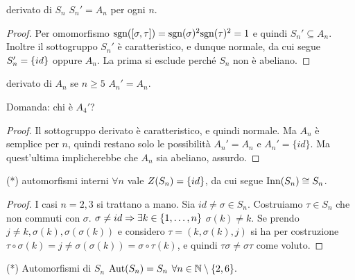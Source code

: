 \begin{proposition}{derivato di $S_n$}
    $S_n' = A_n$ per ogni $n$.    
\end{proposition}
\begin{proof}
    Per omomorfismo $\text{sgn}([\sigma, \tau]) = \text{sgn}(\sigma)^2\text{sgn}(\tau)^2 = 1$ e quindi $S_n' \subseteq A_n$. \\ Inoltre il sottogruppo $S_n'$ è caratteristico, e dunque normale, da cui segue $S_n' = \left\{ id \right\}$ oppure $A_n$. La prima si esclude perché $S_n$ non è abeliano. 
\end{proof}
\begin{proposition}{derivato di $A_n$}
    se $n \geq 5$ $A_n' = A_n$.
    
    Domanda: chi è $A_4'$?
\end{proposition}
\begin{proof}
    Il sottogruppo derivato è caratteristico, e quindi normale. Ma $A_n$ è semplice per $n $, quindi restano solo le possibilità $A_n' = A_n$ e $A_n' = \{ id\}$. Ma quest'ultima implicherebbe che $A_n$ sia abeliano, assurdo. 
\end{proof}
\hypertarget{InnSn}{\begin{proposition}{(*) automorfismi interni}
    $\forall n$ vale $Z(S_n) = \left\{ id \right\}$, da cui segue $\text{Inn}(S_n) \cong S_n$. 
\end{proposition}}
\begin{proof}
    I casi $n = 2,3$ si trattano a mano. Sia $id \neq \sigma \in S_n$. Costruiamo $\tau \in S_n$ che non commuti con $\sigma$. $\sigma \neq id \Rightarrow \exists k \in \left\{ 1, \dots, n \right\}$ $\sigma(k) \neq k$. Se prendo $j \neq k,\sigma(k),\sigma(\sigma(k))$ e considero $\tau = (k, \sigma(k), j)$ si ha per costruzione $\tau\circ\sigma(k) = j \neq \sigma(\sigma(k)) = \sigma\circ\tau(k)$, e quindi $\tau\sigma \neq \sigma\tau $ come voluto.
\end{proof}
\begin{proposition}{(*) Automorfismi di $S_n$}
    $\text{Aut}(S_n) = S_n$ $\forall n \in \mathbb{N} \setminus \{2, 6\}.$
\end{proposition}
